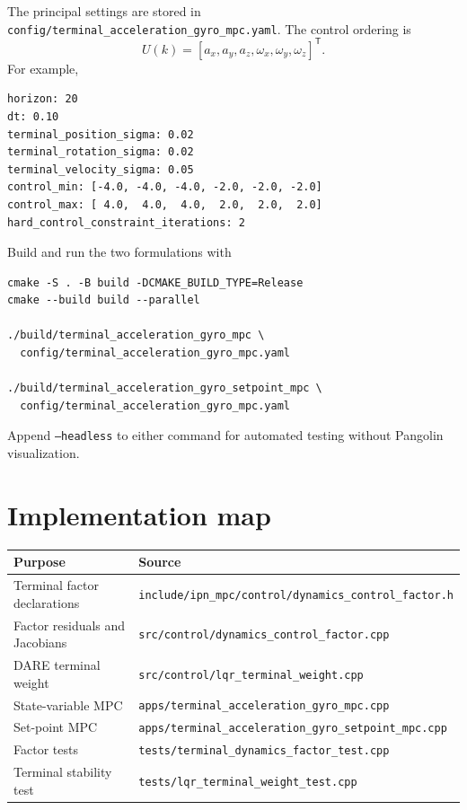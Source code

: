 \documentclass[11pt]{article}
\newcommand{\transpose}{\mathsf{T}}
\begin{document}
The principal settings are stored in
\texttt{config/terminal\_acceleration\_gyro\_mpc.yaml}.  The control ordering is
\begin{equation}
U(k)=[a_x,a_y,a_z,\omega_x,\omega_y,\omega_z]^\transpose.
\end{equation}
For example,
\begin{verbatim}
horizon: 20
dt: 0.10
terminal_position_sigma: 0.02
terminal_rotation_sigma: 0.02
terminal_velocity_sigma: 0.05
control_min: [-4.0, -4.0, -4.0, -2.0, -2.0, -2.0]
control_max: [ 4.0,  4.0,  4.0,  2.0,  2.0,  2.0]
hard_control_constraint_iterations: 2
\end{verbatim}

Build and run the two formulations with
\begin{verbatim}
cmake -S . -B build -DCMAKE_BUILD_TYPE=Release
cmake --build build --parallel

./build/terminal_acceleration_gyro_mpc \
  config/terminal_acceleration_gyro_mpc.yaml

./build/terminal_acceleration_gyro_setpoint_mpc \
  config/terminal_acceleration_gyro_mpc.yaml
\end{verbatim}
Append \texttt{--headless} to either command for automated testing without Pangolin visualization.

\section{Implementation map}

\begin{center}
\begin{tabular}{@{}ll@{}}
\toprule
Purpose & Source \\
\midrule
Terminal factor declarations &
\texttt{include/ipn\_mpc/control/dynamics\_control\_factor.h} \\
Factor residuals and Jacobians &
\texttt{src/control/dynamics\_control\_factor.cpp} \\
DARE terminal weight &
\texttt{src/control/lqr\_terminal\_weight.cpp} \\
State-variable MPC &
\texttt{apps/terminal\_acceleration\_gyro\_mpc.cpp} \\
Set-point MPC &
\texttt{apps/terminal\_acceleration\_gyro\_setpoint\_mpc.cpp} \\
Factor tests &
\texttt{tests/terminal\_dynamics\_factor\_test.cpp} \\
Terminal stability test &
\texttt{tests/lqr\_terminal\_weight\_test.cpp} \\
\bottomrule
\end{tabular}
\end{center}
\end{document}
